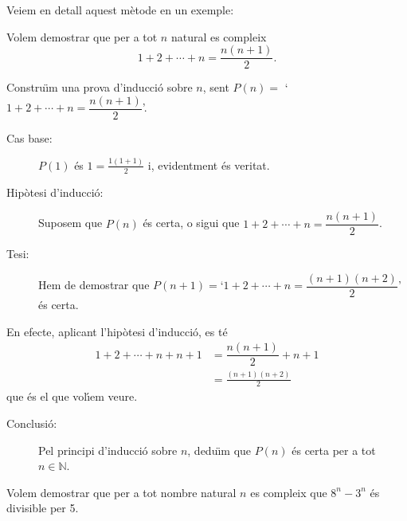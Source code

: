 \bigskip

Veiem en detall aquest m\`{e}tode en un exemple:

\begin{exemple}
Volem demostrar que per a tot $n$ natural es compleix%
\begin{equation*}
1+2+\cdots+n=\frac{n(n+1)}{2}\text{.}
\end{equation*}
\end{exemple}

\begin{solucio}
Constru\"{\i}m una prova d'inducci\'{o} sobre $n$, sent $P(n)=$ `$1+2+\cdots
+n=\dfrac{n(n+1)}{2}$'.

\begin{description}
\item[Cas base:] $P(1)$ \'{e}s $1=\frac{1(1+1)}{2}$ i, evidentment \'{e}s
veritat.

\item[Hip\`{o}tesi d'inducci\'{o}:] Suposem que $P(n)$ \'{e}s certa, o sigui
que $1+2+\cdots+n=\dfrac{n(n+1)}{2}$.

\item[Tesi:] Hem de demostrar que $P(n+1)=$`$1+2+\cdots+n=\dfrac {(n+1)(n+2)%
}{2}$' \'{e}s certa.
\end{description}

En efecte, aplicant l'hip\`{o}tesi d'inducci\'{o}, es t\'{e}%
\begin{align*}
1+2+\cdots+n+n+1 & =\dfrac{n(n+1)}{2}+n+1 \\
& =\frac{\left( n+1\right) (n+2)}{2}
\end{align*}
que \'{e}s el que vol\'{\i}em veure.

\begin{description}
\item[Conclusi\'{o}:] Pel principi d'inducci\'{o} sobre $n$, dedu\"{\i}m que
$P(n)$ \'{e}s certa per a tot $n\in\mathbb{N}$.
\end{description}
\end{solucio}

\begin{exemple}
Volem demostrar que per a tot nombre natural $n$ es compleix que $%
8^{n}-3^{n} $ \'{e}s divisible per 5.
\end{exemple}

